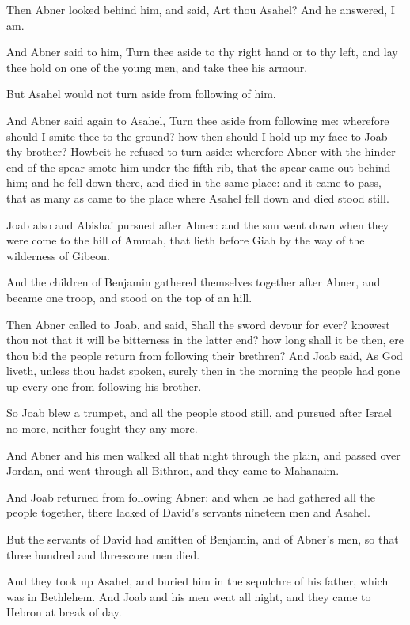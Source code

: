 \Verse Then Abner looked behind him, and said, Art thou Asahel? And he answered, I am.

\Verse And Abner said to him, Turn thee aside to thy right hand or to thy left, and lay thee hold on one of the young men, and take thee his armour.

But Asahel would not turn aside from following of him.

\Verse And Abner said again to Asahel, Turn thee aside from following me: wherefore should I smite thee to the ground? how then should I hold up my face to Joab thy brother?  \Verse Howbeit he refused to turn aside: wherefore Abner with the hinder end of the spear smote him under the fifth rib, that the spear came out behind him; and he fell down there, and died in the same place: and it came to pass, that as many as came to the place where Asahel fell down and died stood still.

\Verse Joab also and Abishai pursued after Abner: and the sun went down when they were come to the hill of Ammah, that lieth before Giah by the way of the wilderness of Gibeon.

\Verse And the children of Benjamin gathered themselves together after Abner, and became one troop, and stood on the top of an hill.

\Verse Then Abner called to Joab, and said, Shall the sword devour for ever?  knowest thou not that it will be bitterness in the latter end?  how long shall it be then, ere thou bid the people return from following their brethren?  \Verse And Joab said, As God liveth, unless thou hadst spoken, surely then in the morning the people had gone up every one from following his brother.

\Verse So Joab blew a trumpet, and all the people stood still, and pursued after Israel no more, neither fought they any more.

\Verse And Abner and his men walked all that night through the plain, and passed over Jordan, and went through all Bithron, and they came to Mahanaim.

\Verse And Joab returned from following Abner: and when he had gathered all the people together, there lacked of David's servants nineteen men and Asahel.

\Verse But the servants of David had smitten of Benjamin, and of Abner's men, so that three hundred and threescore men died.

\Verse And they took up Asahel, and buried him in the sepulchre of his father, which was in Bethlehem. And Joab and his men went all night, and they came to Hebron at break of day.


